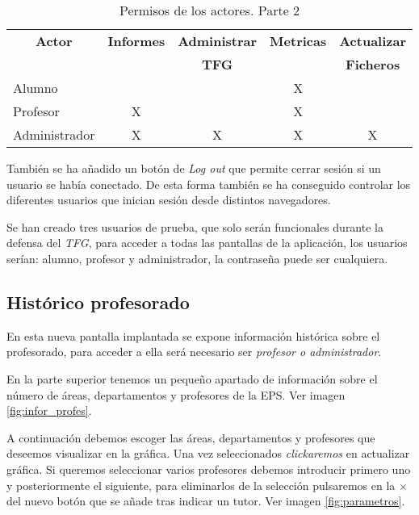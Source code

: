  \begin{table}[]
	\label{actores2}
	\centering
	\begin{tabular}{|l|c|c|c|c|}
		\hline
		\multicolumn{1}{|c|}{\textbf{Actor}}     &  \textbf{Informes} & \textbf{Administrar} & \textbf{Metricas} & \textbf{Actualizar}\\
		\multicolumn{1}{|c|}{}     & {} & \textbf{TFG} & {} & \textbf{Ficheros}\\\hline
		Alumno & {} & {} & X & {} \\ \hline
		Profesor  & X & {} & X   & {}  \\ \hline
		Administrador   & X & X & X  & X  \\ \hline
	\end{tabular}
	\caption{Permisos de los actores. Parte 2}
\end{table}

También se ha añadido un botón de \emph{Log out} que permite cerrar sesión si un usuario se había conectado. 
De esta forma también se ha conseguido controlar los diferentes usuarios que inician sesión desde distintos navegadores.

Se han creado tres usuarios de prueba, que solo serán funcionales durante la defensa del \emph{TFG}, para acceder a todas las pantallas de la aplicación, los usuarios serían: alumno, profesor y administrador, la contraseña puede ser cualquiera.
\subsection{Histórico profesorado}
En esta nueva pantalla implantada se expone información histórica sobre el profesorado, para acceder a ella será necesario ser \emph{profesor o administrador}.

En la parte superior tenemos un pequeño apartado de información sobre el número de áreas, departamentos y profesores de la EPS. Ver imagen \ref{fig:infor_profes}.


A continuación debemos escoger las áreas, departamentos y profesores que deseemos visualizar en la gráfica. Una vez seleccionados \emph{clickaremos} en actualizar gráfica.
Si queremos seleccionar varios profesores debemos introducir primero uno y posteriormente el siguiente, para eliminarlos de la selección pulsaremos en la $\times$ del nuevo botón que se añade tras indicar un tutor. Ver imagen \ref{fig:parametros}.


